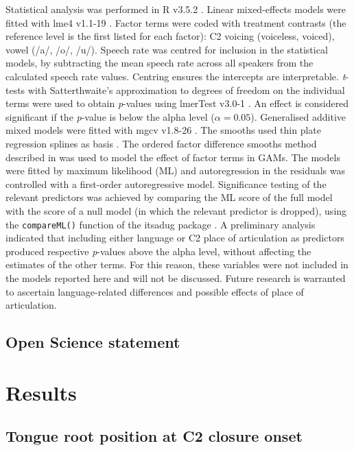 \documentclass[12pt,]{article}
\begin{document}
Statistical analysis was performed in R v3.5.2 \citep{r-core-team2018}.
Linear mixed-effects models were fitted with lme4 v1.1-19
\citep{bates2015}. Factor terms were coded with treatment contrasts (the
reference level is the first listed for each factor): C2 voicing
(voiceless, voiced), vowel (/a/, /o/, /u/). Speech rate was centred for
inclusion in the statistical models, by subtracting the mean speech rate
across all speakers from the calculated speech rate values. Centring
ensures the intercepts are interpretable. \emph{t}-tests with
Satterthwaite's approximation to degrees of freedom on the individual
terms were used to obtain \emph{p}-values using lmerTest v3.0-1
\citep{kuznetsova2017, luke2017}. An effect is considered significant if
the \emph{p}-value is below the alpha level (\(\alpha = 0.05\)).
Generalised additive mixed models were fitted with mgcv v1.8-26
\citep{wood2011, wood2017}. The smooths used thin plate regression
splines as basis \citep{wood2003}. The ordered factor difference smooths
method described in \citet{soskuthy2017, wieling2018} was used to model
the effect of factor terms in GAMs. The models were fitted by maximum
likelihood (ML) and autoregression in the residuals was controlled with
a first-order autoregressive model. Significance testing of the relevant
predictors was achieved by comparing the ML score of the full model with
the score of a null model (in which the relevant predictor is dropped),
using the \texttt{compareML()} function of the itsadug package
\citep{van-rij2017}. A preliminary analysis indicated that including
either language or C2 place of articulation as predictors produced
respective \emph{p}-values above the alpha level, without affecting the
estimates of the other terms. For this reason, these variables were not
included in the models reported here and will not be discussed. Future
research is warranted to ascertain language-related differences and
possible effects of place of articulation.

\subsection{Open Science statement}\label{open-science-statement}

\section{Results}\label{results}

\label{s:results}

\subsection{Tongue root position at C2 closure
onset}\label{tongue-root-position-at-c2-closure-onset}
\end{document}
